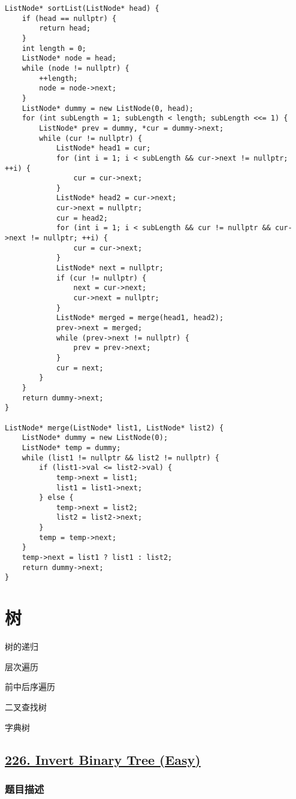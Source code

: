 \documentclass[lang=cn,10pt]{elegantbook}
\begin{document}
\begin{lstlisting}
ListNode* sortList(ListNode* head) {
	if (head == nullptr) {
		return head;
	}
	int length = 0;
	ListNode* node = head;
	while (node != nullptr) {
		++length;
		node = node->next;
	}
	ListNode* dummy = new ListNode(0, head);
	for (int subLength = 1; subLength < length; subLength <<= 1) {
		ListNode* prev = dummy, *cur = dummy->next;
		while (cur != nullptr) {
			ListNode* head1 = cur;
			for (int i = 1; i < subLength && cur->next != nullptr; ++i) {
				cur = cur->next;
			}
			ListNode* head2 = cur->next;
			cur->next = nullptr;
			cur = head2;
			for (int i = 1; i < subLength && cur != nullptr && cur->next != nullptr; ++i) {
				cur = cur->next;
			}
			ListNode* next = nullptr;
			if (cur != nullptr) {
				next = cur->next;
				cur->next = nullptr;
			}
			ListNode* merged = merge(head1, head2);
			prev->next = merged;
			while (prev->next != nullptr) {
				prev = prev->next;
			}
			cur = next;
		}
	}
	return dummy->next;
}

ListNode* merge(ListNode* list1, ListNode* list2) {
	ListNode* dummy = new ListNode(0);
	ListNode* temp = dummy;
	while (list1 != nullptr && list2 != nullptr) {
		if (list1->val <= list2->val) {
			temp->next = list1;
			list1 = list1->next;
		} else {
			temp->next = list2;
			list2 = list2->next;
		}
		temp = temp->next;
	}
	temp->next = list1 ? list1 : list2;
	return dummy->next;
}
\end{lstlisting}

\chapter{树}

\begin{introduction}[前情提要]
	\item 树的递归
	\item 层次遍历
	\item 前中后序遍历
	\item 二叉查找树
	\item 字典树
\end{introduction}

{\color{red}\section{\href{https://leetcode.cn/problems/invert-binary-tree/}{226. Invert Binary Tree (Easy)}}} \label{ch14.226}

\subsection*{题目描述}
\end{document}
